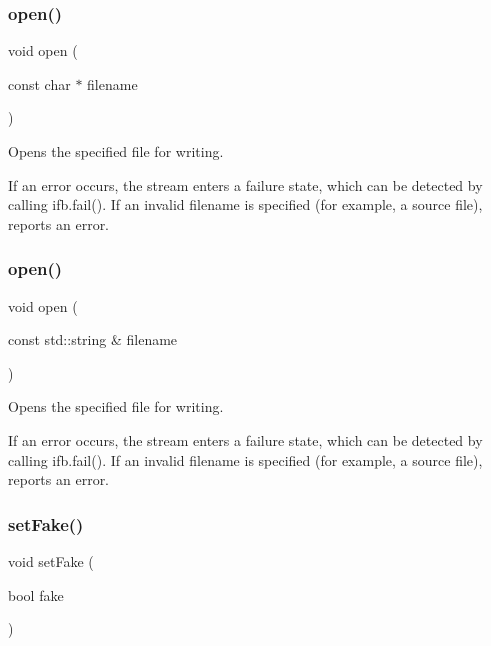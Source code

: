 \subsubsection{\texorpdfstring{open()}{open()}\hspace{0.1cm}{\footnotesize\ttfamily [1/2]}}
{\footnotesize\ttfamily void open (\begin{DoxyParamCaption}\item[{const char $\ast$}]{filename }\end{DoxyParamCaption})}



Opens the specified file for writing. 

If an error occurs, the stream enters a failure state, which can be detected by calling ifb.\+fail(). If an invalid filename is specified (for example, a source file), reports an error. \mbox{\label{classofbitstream_a72f6f3d1b9bc5a4275359cc0a83a60bd}} 
\subsubsection{\texorpdfstring{open()}{open()}\hspace{0.1cm}{\footnotesize\ttfamily [2/2]}}
{\footnotesize\ttfamily void open (\begin{DoxyParamCaption}\item[{const std\+::string \&}]{filename }\end{DoxyParamCaption})}



Opens the specified file for writing. 

If an error occurs, the stream enters a failure state, which can be detected by calling ifb.\+fail(). If an invalid filename is specified (for example, a source file), reports an error. \mbox{\label{classobitstream_ad916b4624eb09d375514964f867b475c}} 
\subsubsection{\texorpdfstring{set\+Fake()}{setFake()}}
{\footnotesize\ttfamily void set\+Fake (\begin{DoxyParamCaption}\item[{bool}]{fake }\end{DoxyParamCaption})\hspace{0.3cm}{\ttfamily [inherited]}}



